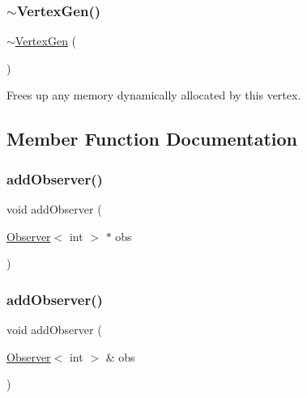 \subsubsection{\texorpdfstring{$\sim$\+Vertex\+Gen()}{~VertexGen()}}
{\footnotesize\ttfamily $\sim$\mbox{\hyperlink{classVertexGen}{Vertex\+Gen}} (\begin{DoxyParamCaption}{ }\end{DoxyParamCaption})}



Frees up any memory dynamically allocated by this vertex. 



\subsection{Member Function Documentation}
\mbox{\label{classObservable_a7fa6df797eb4680c2776371f2937a1b2}} 
\subsubsection{\texorpdfstring{add\+Observer()}{addObserver()}\hspace{0.1cm}{\footnotesize\ttfamily [1/2]}}
{\footnotesize\ttfamily void add\+Observer (\begin{DoxyParamCaption}\item[{\mbox{\hyperlink{classObserver}{Observer}}$<$ int  $>$ $\ast$}]{obs }\end{DoxyParamCaption})\hspace{0.3cm}{\ttfamily [inherited]}}

\mbox{\label{classObservable_a49fbc8dd9a3300429f7f575dc7ba0be8}} 
\subsubsection{\texorpdfstring{add\+Observer()}{addObserver()}\hspace{0.1cm}{\footnotesize\ttfamily [2/2]}}
{\footnotesize\ttfamily void add\+Observer (\begin{DoxyParamCaption}\item[{\mbox{\hyperlink{classObserver}{Observer}}$<$ int  $>$ \&}]{obs }\end{DoxyParamCaption})\hspace{0.3cm}{\ttfamily [inherited]}}

